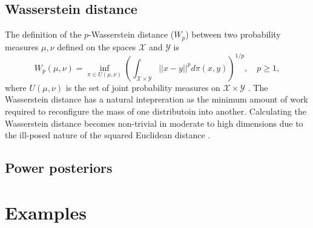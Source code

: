 \documentclass[12pt]{article}
\begin{document}
\subsection{Wasserstein distance}
The definition of the $p$-Wasserstein distance ($W_p$) between two probability
measures $\mu, \nu$ defined on the spaces $\mathcal{X}$ and $\mathcal{Y}$ is 
\begin{equation}
W_p(\mu, \nu) = \inf_{\pi \in U(\mu, \nu)} \left(\int_{\mathcal{X} \times \mathcal{Y}}||x-y||^pd\pi(x, y) \right)^{1/p}, \quad p\geq 1,
\label{wasser:ana}
\end{equation}
where $U(\mu, \nu)$ is the set of joint probability measures on
$\mathcal{X}\times \mathcal{Y}$ \citep{villaniOptimalTransportOld2009}. The
Wasserstein distance has a natural intepreration as the minimum amount of work
required to reconfigure the mass of one distributoin into another. Calculating
the Wasserstein distance becomes non-trivial in moderate to high dimensions due
to the ill-posed nature of the squared Euclidean distance
\citep{cuturiMongeBregmanOccam2023}. 

\subsection{Power posteriors}

\section{Examples}
\end{document}
